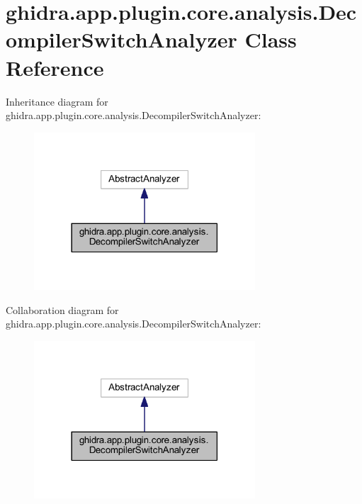 \hypertarget{classghidra_1_1app_1_1plugin_1_1core_1_1analysis_1_1_decompiler_switch_analyzer}{}\section{ghidra.\+app.\+plugin.\+core.\+analysis.\+Decompiler\+Switch\+Analyzer Class Reference}
\label{classghidra_1_1app_1_1plugin_1_1core_1_1analysis_1_1_decompiler_switch_analyzer}


Inheritance diagram for ghidra.\+app.\+plugin.\+core.\+analysis.\+Decompiler\+Switch\+Analyzer\+:
\nopagebreak
\begin{figure}[H]
\begin{center}
\leavevmode
\includegraphics[width=234pt]{classghidra_1_1app_1_1plugin_1_1core_1_1analysis_1_1_decompiler_switch_analyzer__inherit__graph}
\end{center}
\end{figure}


Collaboration diagram for ghidra.\+app.\+plugin.\+core.\+analysis.\+Decompiler\+Switch\+Analyzer\+:
\nopagebreak
\begin{figure}[H]
\begin{center}
\leavevmode
\includegraphics[width=234pt]{classghidra_1_1app_1_1plugin_1_1core_1_1analysis_1_1_decompiler_switch_analyzer__coll__graph}
\end{center}
\end{figure}

